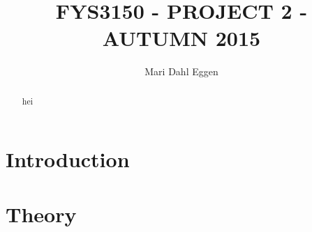 \documentclass[12pt]{article}
\begin{document}
\title{FYS3150 - PROJECT 2 - AUTUMN 2015}
\author{Mari Dahl Eggen}
\maketitle

\newpage

\begin{flushleft}
\begin{abstract}
hei
\end{abstract}
\section*{Introduction}

\newpage
\section*{Theory}

\end{flushleft}
\end{document}
